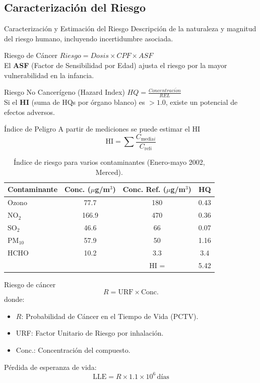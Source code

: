 \documentclass[10pt,compress]{beamer}
\begin{document}
\subsection{Caracterización del Riesgo}
\begin{frame}{Caracterización y Estimación del Riesgo}
Descripción de la naturaleza y magnitud del riesgo humano, incluyendo incertidumbre asociada.
    \begin{block}{Riesgo de Cáncer}
        $Riesgo = Dosis \times CPF \times ASF$ \\
        El \textbf{ASF} (Factor de Sensibilidad por Edad) ajusta el riesgo por la mayor vulnerabilidad en la infancia.
    \end{block}
    \begin{block}{Riesgo No Cancerígeno (Hazard Index)}
        $HQ = \frac{Concentraci\acute{o}n}{REL}$ \\
        Si el \textbf{HI} (suma de HQs por órgano blanco) es $> 1.0$, existe un potencial de efectos adversos.
    \end{block}
\end{frame}

\begin{frame}{Índice de Peligro}
A partir de mediciones se puede estimar el HI
\[
\text{HI} = \sum \frac{C_{\text{media}i}}{C_{\text{ref}i}}
\]
\begin{table}
\centering
\begin{tabular}{lccc}
\toprule
\textbf{Contaminante} & Conc. ($\mu$g/m$^3$) & Conc. Ref. ($\mu$g/m$^3$) & HQ \\
\midrule
Ozono & 77.7 & 180 & 0.43 \\
NO$_2$ & 166.9 & 470 & 0.36 \\
SO$_2$ & 46.6 & 66 & 0.07 \\
PM$_{10}$ & 57.9 & 50 & 1.16 \\
HCHO & 10.2 & 3.3 & 3.4 \\\hline
 & & HI =& 5.42\\
\bottomrule
\end{tabular}
\caption{Índice de riesgo para varios contaminantes (Enero-mayo 2002, Merced).}
\end{table}
\end{frame}

\begin{frame}{Riesgo de cáncer}
\[
R = \text{URF} \times \text{Conc.}
\]
donde:
\begin{itemize}
\item \(R\): Probabilidad de Cáncer en el Tiempo de Vida (PCTV).
\item URF: Factor Unitario de Riesgo por inhalación.
\item Conc.: Concentración del compuesto.
\end{itemize}
Pérdida de esperanza de vida:
\[
\text{LLE} = R \times 1.1 \times 10^6 \, \text{días}
\]
\end{frame}
\end{document}
